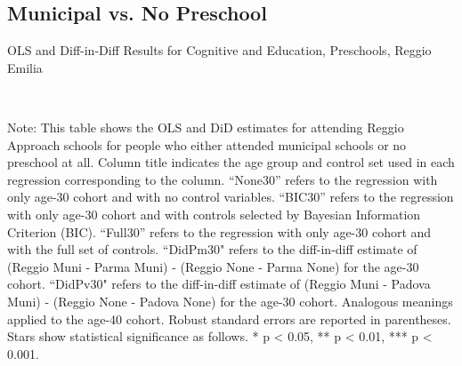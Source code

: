 \begin{landscape}

\end{landscape}

\begin{landscape}
\section{Municipal vs. No Preschool}
\begin{table}[H] \caption{OLS and Diff-in-Diff Results for Cognitive and Education, Preschools, Reggio Emilia} \label{ols-E-reg}
\scalebox{0.85}{}
\vspace{1ex} \\
\footnotesize\raggedright{Note: This table shows the OLS and DiD estimates for attending Reggio Approach schools for people who either attended municipal schools or no preschool at all. Column title indicates the age group and control set used in each regression corresponding to the column. ``None30'' refers to the regression with only age-30 cohort and with no control variables. ``BIC30'' refers to the regression with only age-30 cohort and with controls selected by Bayesian Information Criterion (BIC). ``Full30'' refers to the regression with only age-30 cohort and with the full set of controls. ``DidPm30" refers to the diff-in-diff estimate of (Reggio Muni - Parma Muni) - (Reggio None - Parma None) for the age-30 cohort. ``DidPv30" refers to the diff-in-diff estimate of (Reggio Muni - Padova Muni) - (Reggio None - Padova None) for the age-30 cohort. Analogous meanings applied to the age-40 cohort. Robust standard errors are reported in parentheses. Stars show statistical significance as follows. * p < 0.05, ** p < 0.01, *** p < 0.001.}
\end{table}



\end{landscape}
